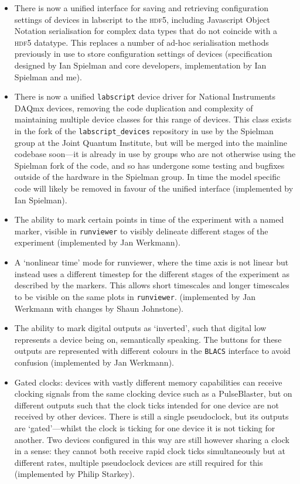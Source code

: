 \begin{itemize}
    \item There is now a unified interface for saving and retrieving configuration settings of devices in labscript to the \textsc{hdf5}, including Javascript Object Notation serialisation for complex data types that do not coincide with a \textsc{hdf5} datatype. This replaces a number of ad-hoc serialisation methods previously in use to store configuration settings of devices (specification designed by Ian Spielman and core developers, implementation by Ian Spielman and me).
    
    \item There is now a unified \texttt{labscript} device driver for National Instruments DAQmx devices, removing the code duplication and complexity of maintaining multiple device classes for this range of devices. This class exists in the fork of the \texttt{labscript\_devices} repository in use by the Spielman group at the Joint Quantum Institute, but will be merged into the mainline codebase soon---it is already in use by groups who are not otherwise using the Spielman fork of the code, and so has undergone some testing and bugfixes outside of the hardware in the Spielman group. In time the model specific code will likely be removed in favour of the unified interface (implemented by Ian Spielman).
    
    \item The ability to mark certain points in time of the experiment with a named marker, visible in \texttt{runviewer} to visibly delineate different stages of the experiment (implemented by Jan Werkmann).
    
    \item A `nonlinear time' mode for runviewer, where the time axis is not linear but instead uses a different timestep for the different stages of the experiment as described by the markers. This allows short timescales and longer timescales to be visible on the same plots in \texttt{runviewer}. (implemented by Jan Werkmann with changes by Shaun Johnstone).
    
    \item The ability to mark digital outputs as `inverted', such that digital low represents a device being on, semantically speaking. The buttons for these outputs are represented with different colours in the \texttt{BLACS} interface to avoid confusion (implemented by Jan Werkmann).
    
    \item Gated clocks: devices with vastly different memory capabilities can receive clocking signals from the same clocking device such as a PulseBlaster, but on different outputs such that the clock ticks intended for one device are not received by other devices. There is still a single pseudoclock, but its outputs are `gated'---whilst the clock is ticking for one device it is not ticking for another. Two devices configured in this way are still however sharing a clock in a sense: they cannot both receive rapid clock ticks simultaneously but at different rates, multiple pseudoclock devices are still required for this (implemented by Philip Starkey).
    

\end{itemize}
